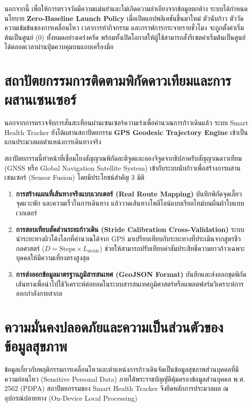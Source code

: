 นอกจากนี้ เพื่อให้การตรวจวัดมีความแม่นยำและไม่เกิดความลำเอียงจากข้อมูลตกค้าง ระบบได้กำหนดนโยบาย \textbf{Zero-Baseline Launch Policy} เมื่อเปิดแอปพลิเคชันขึ้นมาใหม่ ตัวนับก้าว ตัววัดความเข้มข้นของการเคลื่อนไหว เวลาการทำกิจกรรม และกราฟการกระจายรายชั่วโมง จะถูกตั้งค่าเริ่มต้นเป็นศูนย์ ($0$) ทั้งหมดอย่างเคร่งครัด พร้อมทั้งเปิดโอกาสให้ผู้ใช้สามารถสั่งรีเซตค่าเริ่มต้นเป็นศูนย์ได้ตลอดเวลาผ่านปุ่มควบคุมบนแถบเครื่องมือ

\section{สถาปัตยกรรมการติดตามพิกัดดาวเทียมและการผสานเซนเซอร์}
นอกจากการตรวจจับการสั่นสะเทือนผ่านเซนเซอร์ความเร่งเพื่อคำนวณการก้าวเดินแล้ว ระบบ Smart Health Tracker ยังได้ผสานสถาปัตยกรรม \textbf{GPS Geodesic Trajectory Engine} เข้าเป็นแกนประมวลผลตำแหน่งการเดินทางจริง

สถาปัตยกรรมนี้ทำหน้าที่เชื่อมโยงสัญญาณพิกัดละติจูดและลองจิจูดจากชิปภาครับสัญญาณดาวเทียม (GNSS หรือ Global Navigation Satellite System) เข้ากับระบบนับก้าวเพื่อสร้างการผสานเซนเซอร์ (Sensor Fusion) โดยมีประโยชน์สำคัญ 3 มิติ
\begin{enumerate}
    \item \textbf{การสร้างแผนที่เส้นทางจริงแบบเวกเตอร์ (Real Route Mapping)} บันทึกพิกัดจุดเลี้ยว จุดแวะพัก และความเร็วในการเดินทาง แล้ววาดเส้นทางโพลีไลน์แบบเรียลไทม์บนผืนผ้าใบแบบเวกเตอร์
    \item \textbf{การสอบเทียบสัดส่วนระยะก้าวเดิน (Stride Calibration Cross-Validation)} ระบบนำระยะทางผิวโค้งโลกที่คำนวณได้จาก GPS มาเปรียบเทียบกับระยะทางที่ประเมินจากสูตรชีวกลศาสตร์ ($D = \text{Steps} \times L_{\text{stride}}$) ช่วยให้สามารถปรับเทียบค่าสัมประสิทธิ์ความยาวก้าวเฉพาะบุคคลให้มีความเที่ยงตรงสูงสุด
    \item \textbf{การส่งออกข้อมูลมาตรฐานภูมิสารสนเทศ (GeoJSON Format)} บันทึกและส่งออกชุดพิกัดเส้นทางเพื่อนำไปใช้วิเคราะห์ต่อยอดในระบบสารสนเทศภูมิศาสตร์หรือแพลตฟอร์มวิเคราะห์การออกกำลังกายสากล
\end{enumerate}

\section{ความมั่นคงปลอดภัยและความเป็นส่วนตัวของข้อมูลสุขภาพ}
ข้อมูลเกี่ยวกับพฤติกรรมการเคลื่อนไหวและตำแหน่งการก้าวเดินจัดเป็นข้อมูลสุขภาพส่วนบุคคลที่มีความอ่อนไหว (Sensitive Personal Data) ภายใต้พระราชบัญญัติคุ้มครองข้อมูลส่วนบุคคล พ.ศ. 2562 (PDPA) สถาปัตยกรรมของ Smart Health Tracker จึงยึดหลักการประมวลผล ณ อุปกรณ์ปลายทาง (On-Device Local Processing)

